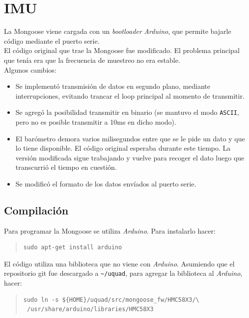 \documentclass[main]{subfiles}
\begin{document}
\section{IMU}
\label{sec:codigo:imu}

La Mongoose viene cargada con un \textit{bootloader} \textit{Arduino}, que permite bajarle código mediante el puerto serie.\\

El código original que trae la Mongoose fue modificado. El problema principal que tenía era que la frecuencia de muestreo no era estable.\\

Algunos cambios:
\begin{itemize}
\item Se implementó transmisión de datos en segundo plano, mediante interrupciones, evitando trancar el loop principal al momento de transmitir.
\item Se agregó la posibilidad transmitir en binario (se mantuvo el modo \verb+ASCII+, pero no es posible transmitir a 10ms en dicho modo).
\item El barómetro demora varios milisegundos entre que se le pide un dato y que lo tiene disponible. El código original esperaba durante este tiempo. La versión modificada sigue trabajando y vuelve para recoger el dato luego que transcurrió el tiempo en cuestión.
\item Se modificó el formato de los datos envíados al puerto serie.
\end{itemize}

\subsection{Compilación}
\label{sec:codigo:compilacion-mongoose}

Para programar la Mongoose se utiliza \textit{Arduino}. Para instalarlo hacer:
\begin{quote}
\begin{verbatim}
sudo apt-get install arduino
\end{verbatim}
\end{quote}

El código utiliza una biblioteca que no viene con \textit{Arduino}. Asumiendo que el repositorio git fue descargado a \verb+~/uquad+, para agregar la biblioteca al \textit{Arduino}, hacer:
\begin{quote}
\begin{verbatim}
sudo ln -s ${HOME}/uquad/src/mongoose_fw/HMC58X3/\
 /usr/share/arduino/libraries/HMC58X3
\end{verbatim}
\end{quote}
\end{document}
